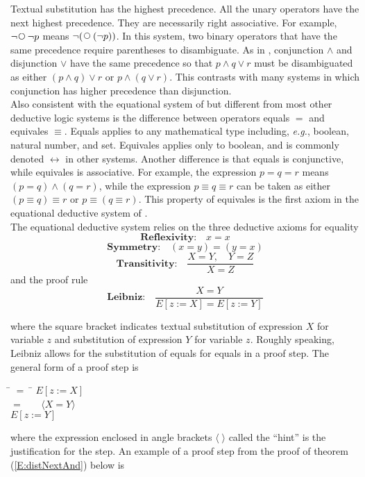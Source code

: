\documentclass[fleqn, leqno]{article}
\newcommand{\lgap}{2pt}                             %
\newcommand{\mymathindent}{24pt}                    %
\newcommand{\Next}{\;\,\text{\raisebox{3.5pt}{\circle{6}}}}
\newcommand{\Gll} {\langle}                         %
\newcommand{\Ggg} {\rangle}                         %
\newcommand{\Hint}[1]     {\ \ \ $\Gll              \mbox{#1} \Ggg$ }   %
\begin{document}
Textual substitution has the highest precedence.
All the unary operators have the next highest precedence.
They are necessarily right associative.
For example, $\lnot \Next \lnot p$ means $\lnot (\Next (\lnot p))$.
In this system, two binary operators that have the same precedence require parentheses to disambiguate.
As in \cite{LADM}, conjunction $\land$ and disjunction $\lor$ have the same precedence so that $p\land q\lor r$
must be disambiguated as either $(p\land q)\lor r$ or $p\land (q\lor r)$.
This contrasts with many systems in which conjunction has higher precedence than disjunction.\\

Also consistent with the equational system of \cite{LADM} but different from most other deductive logic systems
is the difference between operators equals $=$ and equivales $\equiv$.
Equals applies to any mathematical type including, {\itshape e.g.\/}, boolean, natural number, and set.
Equivales applies only to boolean, and is commonly denoted $\leftrightarrow$ in other systems.
Another difference is that equals is conjunctive, while equivales is associative.
For example, the expression $p = q = r$ means $(p = q) \land (q = r)$, while the expression $p \equiv q \equiv r$
can be taken as either $(p \equiv q) \equiv r$ or $p \equiv (q \equiv r)$.
This property of equivales is the first axiom in the equational deductive system of \cite{LADM}.
\\

The equational deductive system relies on the three deductive axioms for equality
\[
\textbf{Reflexivity:}\quad x=x
\]
\[
\textbf{Symmetry:}\quad (x=y) = (y=x)
\]
\[
\textbf{Transitivity:}\quad \frac{X=Y, \quad Y=Z}{X=Z}
\]
and the proof rule
\[
\textbf{Leibniz:}\quad \frac{X=Y}{E[z:=X]=E[z:=Y]}
\]

where the square bracket indicates textual substitution of expression $X$ for variable $z$ and substitution
of expression $Y$ for variable $z$.
Roughly speaking, Leibniz allows for the substitution of equals for equals in a proof step.
The general form of a proof step is

\begin{tabbing}
\hspace{\mymathindent} \= $= \;$ \=  \kill
  \> \>   $E[z:=X]$\\[\lgap]
  \> $=$  \>  \Hint{$X=Y$} \\[\lgap]
  \> \>   $E[z:=Y]$
\end{tabbing}

where the expression enclosed in angle brackets $\Gll\;\Ggg$ called the ``hint'' is the justification for the step.
An example of a proof step from the proof of theorem (\ref{E:distNextAnd}) below is
\end{document}
